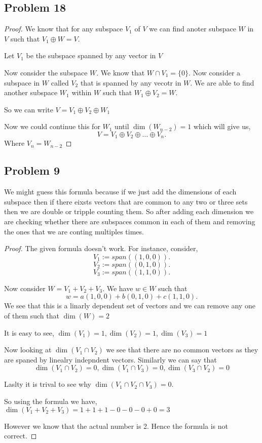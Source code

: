 \documentclass[a4paper]{report}
\begin{document}
\subsection*{Problem 18}

\begin{proof}
    We know that for any subspace $V_1$ of  $V$ we can find anoter subspace $W$ in $V$ such that $V_1 \oplus W = V$. 
    
    Let $V_1$ be the subspace spanned by any vector in $V$

    Now consider the subspace $W$. We know that $W \cap V_1 = \{0\}$. Now consider a subspace in $W$ called  $V_2$ that is spanned by any vecotr in $W$. We are able to find another subspace $W_1$ within $W$ such that $W_1 \oplus V_2 = W$. 

    So we can write $V = V_1 \oplus V_2 \oplus W_1$
    
    Now we could continue this for $W_1$ until $\dim(W_{n-2}) = 1$ which will give us,  \[
    V = V_1 \oplus V_2 \oplus  \dots \oplus V_n
    .\] 
    Where $V_n = W_{n-2}$
\end{proof}

\subsection*{Problem 9}
We might guess this formula because if we just add the dimensions of each subspace then if there eixsts vectors that are common to any two or three sets then we are double or tripple counting them. So after adding each dimension we are checking whether there are subspaces common in each of them and removing the ones that we are conting multiples times.

\begin{proof}
    The given formula doesn't work. For instance, consider, \[
        V_1 := span((1,0,0))
    .\] 
\[
        V_2 := span((0,1,0))
    .\] 
\[
        V_3 := span((1,1,0))
    .\] 

    Now consider $W = V_1 + V_2 + V_3$. We have $w \in W$ such that \[
    w = a(1,0,0) + b(0,1,0) + c(1,1,0)
    .\] 
    We see that this is a linarly dependent set of vectors and we can remove any one of them such that $\dim(W) = 2$

    It is easy to see, $\dim(V_1) = 1, \dim(V_2) = 1, \dim(V_3) = 1$

    Now looking at $\dim(V_1 \cap V_2)$ we see that there are no common vectors as they are spaned by linealry indepndent vectors. Similarly we can say that $$\dim(V_1 \cap V_2) = 0, \dim(V_1 \cap V_3) = 0, \dim(V_3 \cap V_2) = 0$$

    Laslty it is trival to see why $\dim(V_1 \cap V_2\cap V_3) = 0$.

    So using the formula we have, $\dim(V_1+V_2+V_3) = 1 + 1 + 1 - 0 - 0 - 0 + 0 = 3$

    However we know that the actual number is 2. Hence the formula is not correct.




\end{proof}
\end{document}
